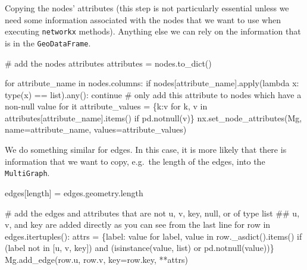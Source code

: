 \documentclass[
  letterpaper,
  DIV=11,
  numbers=noendperiod]{scrreprt}
\newenvironment{Shaded}{\begin{snugshade}}{\end{snugshade}}
\newcommand{\BuiltInTok}[1]{\textcolor[rgb]{0.00,0.23,0.31}{#1}}
\newcommand{\CommentTok}[1]{\textcolor[rgb]{0.37,0.37,0.37}{#1}}
\newcommand{\ControlFlowTok}[1]{\textcolor[rgb]{0.00,0.23,0.31}{#1}}
\newcommand{\KeywordTok}[1]{\textcolor[rgb]{0.00,0.23,0.31}{#1}}
\newcommand{\NormalTok}[1]{\textcolor[rgb]{0.00,0.23,0.31}{#1}}
\newcommand{\OperatorTok}[1]{\textcolor[rgb]{0.37,0.37,0.37}{#1}}
\newcommand{\StringTok}[1]{\textcolor[rgb]{0.13,0.47,0.30}{#1}}
\begin{document}
Copying the nodes' attributes (this step is not particularly essential
unless we need some information associated with the nodes that we want
to use when executing \texttt{networkx} methods). Anything else we can
rely on the information that is in the \texttt{GeoDataFrame}.

\begin{Shaded}
\begin{Highlighting}[]
\CommentTok{\# add the nodes\textquotesingle{} attributes}
\NormalTok{attributes }\OperatorTok{=}\NormalTok{ nodes.to\_dict()}

\ControlFlowTok{for}\NormalTok{ attribute\_name }\KeywordTok{in}\NormalTok{ nodes.columns:}
    \ControlFlowTok{if}\NormalTok{ nodes[attribute\_name].}\BuiltInTok{apply}\NormalTok{(}\KeywordTok{lambda}\NormalTok{ x: }\BuiltInTok{type}\NormalTok{(x) }\OperatorTok{==} \BuiltInTok{list}\NormalTok{).}\BuiltInTok{any}\NormalTok{(): }
        \ControlFlowTok{continue} 
    \CommentTok{\# only add this attribute to nodes which have a non{-}null value for it}
\NormalTok{    attribute\_values }\OperatorTok{=}\NormalTok{ \{k:v }\ControlFlowTok{for}\NormalTok{ k, v }\KeywordTok{in}\NormalTok{ attributes[attribute\_name].items() }\ControlFlowTok{if}\NormalTok{ pd.notnull(v)\}}
\NormalTok{    nx.set\_node\_attributes(Mg, name}\OperatorTok{=}\NormalTok{attribute\_name, values}\OperatorTok{=}\NormalTok{attribute\_values)}
\end{Highlighting}
\end{Shaded}

We do something similar for edges. In this case, it is more likely that
there is information that we want to copy, e.g.~the length of the edges,
into the \texttt{MultiGraph}.

\begin{Shaded}
\begin{Highlighting}[]
\NormalTok{edges[}\StringTok{\textquotesingle{}length\textquotesingle{}}\NormalTok{] }\OperatorTok{=}\NormalTok{ edges.geometry.length}

\CommentTok{\# add the edges and attributes that are not u, v, key, null, or of type list}
\CommentTok{\#\# u, v, and key are added directly as you can see from the last line}
\ControlFlowTok{for}\NormalTok{ row }\KeywordTok{in}\NormalTok{ edges.itertuples():}
\NormalTok{    attrs }\OperatorTok{=}\NormalTok{ \{label: value }\ControlFlowTok{for}\NormalTok{ label, value }\KeywordTok{in}\NormalTok{ row.\_asdict().items() }\ControlFlowTok{if}\NormalTok{ (label }\KeywordTok{not} \KeywordTok{in}\NormalTok{ [}\StringTok{\textquotesingle{}u\textquotesingle{}}\NormalTok{, }\StringTok{\textquotesingle{}v\textquotesingle{}}\NormalTok{, }\StringTok{\textquotesingle{}key\textquotesingle{}}\NormalTok{]) }\KeywordTok{and} 
\NormalTok{             (}\BuiltInTok{isinstance}\NormalTok{(value, }\BuiltInTok{list}\NormalTok{) }\KeywordTok{or}\NormalTok{ pd.notnull(value))\}}
\NormalTok{    Mg.add\_edge(row.u, row.v, key}\OperatorTok{=}\NormalTok{row.key, }\OperatorTok{**}\NormalTok{attrs)}
\end{Highlighting}
\end{Shaded}
\end{document}
